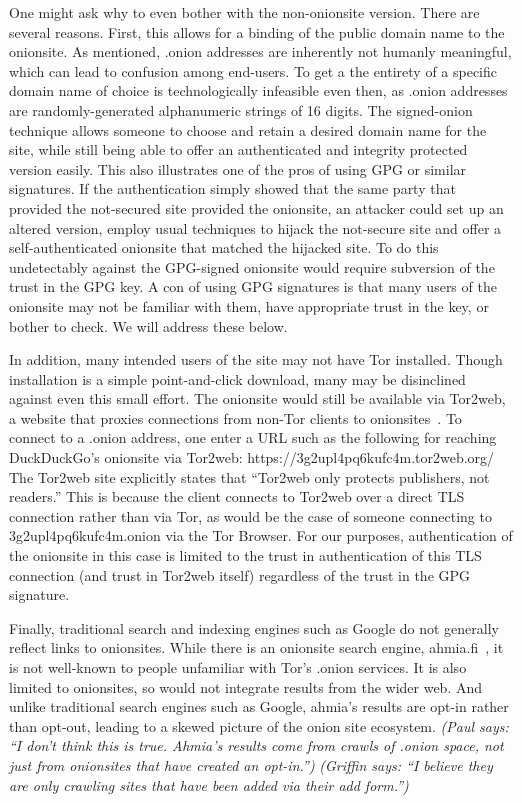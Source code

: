 \documentclass[10pt, conference, compsocconf]{styles/IEEEtran}
\newcommand{\paul}[1]{{\color{red}\em (Paul says: ``#1'')}}
\newcommand{\griffin}[1]{{\color{blue}\em (Griffin says: ``#1'')}}
\begin{document}
One might ask why to even bother with the non-onionsite version. There
are several reasons. First, this allows for a binding of the public
domain name to the onionsite. As mentioned, .onion addresses are
inherently not humanly meaningful, which can lead to confusion among 
end-users.  To get a the entirety of a specific domain name of choice is
technologically infeasible even then, as .onion addresses are
randomly-generated alphanumeric strings of 16 digits. The signed-onion
technique allows someone to choose and retain a desired domain name for the
site, while still being able to offer an authenticated and integrity
protected version easily. This also illustrates one of the pros
of using GPG or similar signatures. If the authentication simply
showed that the same party that provided the not-secured site
provided the onionsite, an attacker could set up an altered version,
employ usual techniques to hijack the not-secure site and offer
a self-authenticated onionsite that matched the hijacked site.
To do this undetectably against the GPG-signed onionsite would require
subversion of the trust in the GPG key. A con of using GPG signatures
is that many users of the onionsite may not be familiar with them,
have appropriate trust in the key, or bother to check. We will address
these below.

In addition, many intended users of the site may not have Tor installed.
Though installation is a simple point-and-click download, many may be
disinclined against even this small effort. The onionsite would still
be available via Tor2web, a website that proxies connections from
non-Tor clients to onionsites~\cite{tor2web}.  To connect to a .onion
address, one enter a URL such as the following for reaching
DuckDuckGo's onionsite via Tor2web:
https://3g2upl4pq6kufc4m.tor2web.org/ The Tor2web site explicitly
states that ``Tor2web only protects publishers, not readers.'' This is
because the client connects to Tor2web over a direct TLS connection
rather than via Tor, as would be the case of someone connecting to
3g2upl4pq6kufc4m.onion via the Tor Browser.  For our purposes,
authentication of the onionsite in this case is limited to the trust
in authentication of this TLS connection (and trust in Tor2web itself)
regardless of the trust in the GPG signature.

Finally, traditional search and indexing engines such as Google do
not generally reflect links to onionsites. While there is an onionsite
search engine, ahmia.fi~\cite{ahmia}, it is not well-known to
people unfamiliar with Tor's .onion services. It is also limited to
onionsites, so would not integrate results from the wider web.  And 
unlike traditional search engines such as Google, ahmia's results are 
opt-in rather than opt-out, leading to a skewed picture of the onion 
site ecosystem.
\paul{I don't think this is true. Ahmia's results come from
crawls of .onion space, not just from onionsites that have created
an opt-in.}
\griffin{I believe they are only crawling sites that have been added via their add form.}
\end{document}
